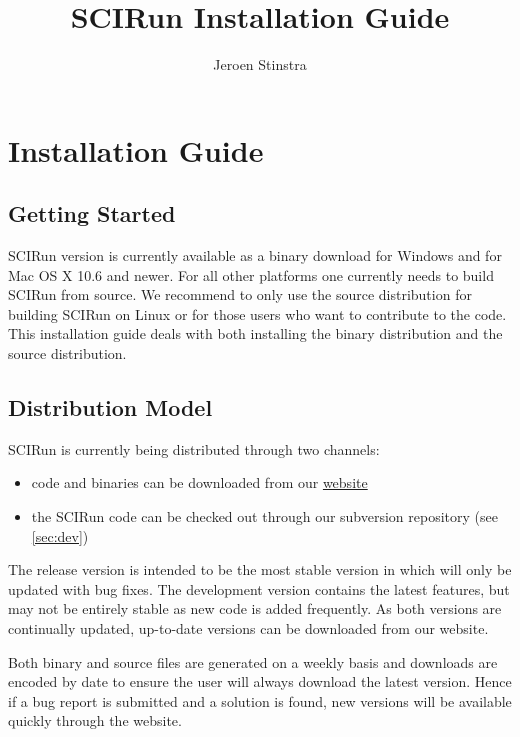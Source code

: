 \documentclass[fleqn,12pt,openany]{book}
\title{SCIRun Installation Guide}
\author{Jeroen Stinstra}
\begin{document}
\maketitle


\chapter{Installation Guide}


\section{Getting Started}

SCIRun version \SCIRunVersion is currently available as a binary download for Windows and for Mac OS X 10.6 and newer.
For all other platforms one currently needs to build SCIRun from source.
We recommend to only use the source distribution for building SCIRun on Linux or for those users who want to contribute to the code.
This installation guide deals with both installing the binary distribution and the source distribution.

\section{Distribution Model}

SCIRun is currently being distributed through two channels:
\begin{itemize}
\item code and binaries can be downloaded from our \href{http://www.scirun.org}{website}
\item the SCIRun code can be checked out through our subversion repository (see \autoref{sec:dev})
\end{itemize}

The release version is intended to be the most stable version in which will only be updated with bug fixes.
The development version contains the latest features, but may not be entirely stable as new code is added frequently.
As both versions are continually updated, up-to-date versions can be downloaded from our website. 

Both binary and source files are generated on a weekly basis and downloads are encoded by date to ensure
the user will always download the latest version.
Hence if a bug report is submitted and a solution is found, new versions will be available quickly through the website.
\end{document}
